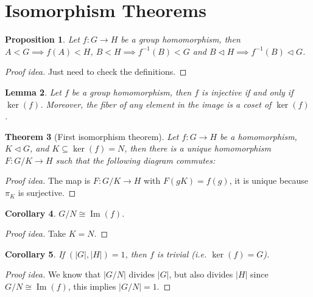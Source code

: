 \documentclass[paper=a4, fontsize=12pt]{scrartcl} %
\newtheorem{thm}{Theorem}[section]
\newtheorem{cor}[thm]{Corollary}
\newtheorem{prop}[thm]{Proposition}
\newtheorem{lem}[thm]{Lemma}
\theoremstyle{definition}
\theoremstyle{remark}
\DeclareMathOperator{\im}{Im}
\numberwithin{equation}{section} %
\numberwithin{figure}{section} %
\numberwithin{table}{section} %
\begin{document}
\section{Isomorphism Theorems}
\begin{prop}
	Let $f: G \rightarrow H$ be a group homomorphism, then $A < G \implies f(A) < H$, $B< H \implies f^{-1}(B) < G$ and $B\lhd H \implies f^{-1}(B) \lhd G$.
\end{prop}
\begin{proof}[Proof idea]
	Just need to check the definitions.
\end{proof}
\begin{lem}
	Let $f$ be a group homomorphism, then $f$ is injective if and only if $\ker(f)$. Moreover, the fiber of any element in the image is a coset of $\ker(f)$.
\end{lem}
\begin{thm}[First isomorphism theorem]
	Let $f: G\rightarrow H$ be a homomorphism, $K \lhd G$, and $K \subseteq \ker(f) = N$, then there is a unique homomorphism $F : G/K \rightarrow H$ such that the following diagram commutes:
	\begin{center}
	\end{center}
\end{thm}
\begin{proof}[Proof idea]
	The map is $F: G/K \rightarrow H$ with $F(gK) = f(g)$, it is unique because $\pi_K$ is surjective.
\end{proof}
\begin{cor}
	$G/N \cong \im(f)$.
\end{cor}
\begin{proof}[Proof idea]
	Take $K = N$.
\end{proof}
\begin{cor}
	If $(|G|, |H|) = 1$, then $f$ is trivial (i.e. $\ker(f) = G$).
\end{cor}
\begin{proof}[Proof idea]
	We know that $|G/N|$ divides $|G|$, but also divides $|H|$ since $G/N \cong \im(f)$, this implies $|G/N| = 1$.
\end{proof}
\end{document}

